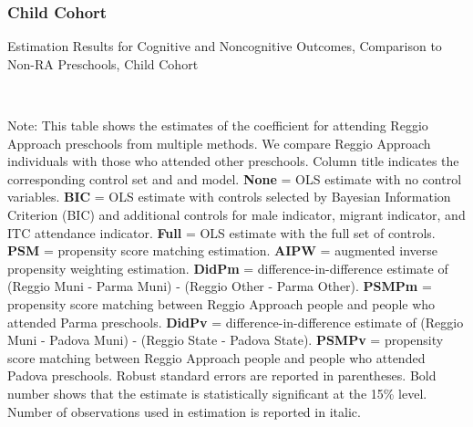 \subsubsection{Child Cohort}
\begin{table}[H] \caption{Estimation Results for Cognitive and Noncognitive Outcomes, Comparison to Non-RA Preschools, Child Cohort} \label{ols-CN-child-reg-reli}
\scalebox{0.8}{}
\vspace{1ex} \\
\footnotesize\raggedright{Note: This table shows the estimates of the coefficient for attending Reggio Approach preschools from multiple methods. We compare Reggio Approach individuals with those who attended other preschools. Column title indicates the corresponding control set and and model. \textbf{None} = OLS estimate with no control variables. \textbf{BIC} = OLS estimate with controls selected by Bayesian Information Criterion (BIC) and additional controls for male indicator, migrant indicator, and ITC attendance indicator. \textbf{Full} = OLS estimate with the full set of controls. \textbf{PSM} =  propensity score matching estimation. \textbf{AIPW} = augmented inverse propensity weighting estimation. \textbf{DidPm} = difference-in-difference estimate of (Reggio Muni - Parma Muni) - (Reggio Other - Parma Other). \textbf{PSMPm} = propensity score matching between Reggio Approach people and people who attended Parma preschools. \textbf{DidPv} = difference-in-difference estimate of (Reggio Muni - Padova Muni) - (Reggio State - Padova State). \textbf{PSMPv} = propensity score matching between Reggio Approach people and people who attended Padova preschools. Robust standard errors are reported in parentheses. Bold number shows that the estimate is statistically significant at the 15\% level. Number of observations used in estimation is reported in italic.}
\end{table}


